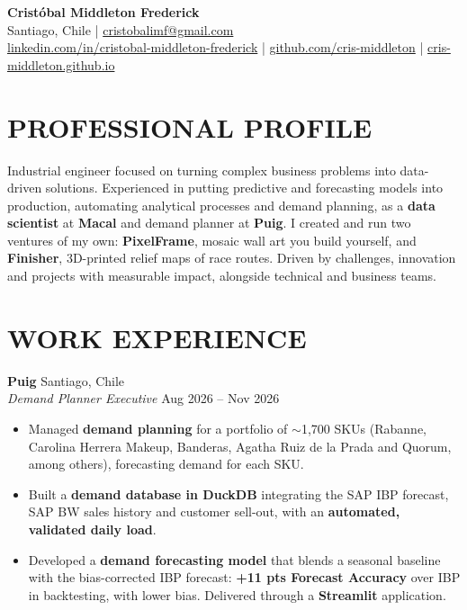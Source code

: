 \documentclass[a4paper,10.5pt]{extarticle}
\newif\ifcontelefono
\begin{document}
\pagestyle{empty}

\begin{center}
\textbf{\Large Cristóbal Middleton Frederick}\\[2pt]
Santiago, Chile | \href{mailto:cristobalimf@gmail.com}{cristobalimf@gmail.com}\ifcontelefono{} | +56 9 3363 9109\fi\\
\href{https://www.linkedin.com/in/cristobal-middleton-frederick/}{linkedin.com/in/cristobal-middleton-frederick} |
\href{https://github.com/cris-middleton}{github.com/cris-middleton} |
\href{https://cris-middleton.github.io}{cris-middleton.github.io}
\end{center}

\section*{PROFESSIONAL PROFILE}

Industrial engineer focused on turning complex business problems into data-driven solutions. Experienced in putting predictive and forecasting models into production, automating analytical processes and demand planning, as a \textbf{data scientist} at \textbf{Macal} and demand planner at \textbf{Puig}. I created and run two ventures of my own: \textbf{PixelFrame}, mosaic wall art you build yourself, and \textbf{Finisher}, 3D-printed relief maps of race routes. Driven by challenges, innovation and projects with measurable impact, alongside technical and business teams.

\section*{WORK EXPERIENCE}

\textbf{Puig} \hfill Santiago, Chile\\
\textit{Demand Planner Executive} \hfill Aug 2026 -- Nov 2026
\begin{itemize}
    \item Managed \textbf{demand planning} for a portfolio of $\sim$1,700 SKUs (Rabanne, Carolina Herrera Makeup, Banderas, Agatha Ruiz de la Prada and Quorum, among others), forecasting demand for each SKU.
    \item Built a \textbf{demand database in DuckDB} integrating the SAP IBP forecast, SAP BW sales history and customer sell-out, with an \textbf{automated, validated daily load}.
    \item Developed a \textbf{demand forecasting model} that blends a seasonal baseline with the bias-corrected IBP forecast: \textbf{+11 pts Forecast Accuracy} over IBP in backtesting, with lower bias. Delivered through a \textbf{Streamlit} application.
\end{itemize}
\end{document}
